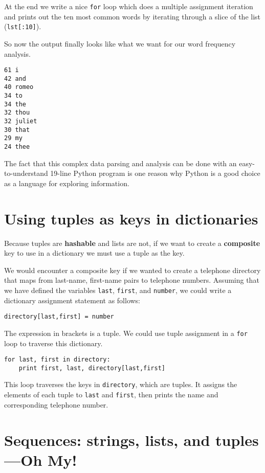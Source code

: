 At the end we write a nice {\tt for} loop which does a multiple
assignment iteration and prints out the ten most common words
by iterating through a slice of the list ({\tt lst[:10]}).

So now the output finally looks like what we want for our word 
frequency analysis.

\beforeverb
\begin{verbatim}
61 i
42 and
40 romeo
34 to
34 the
32 thou
32 juliet
30 that
29 my
24 thee
\end{verbatim}
\afterverb
%
The fact that this complex data parsing and analysis 
can be done with an easy-to-understand 19-line Python
program is one reason why Python is a good choice as a language 
for exploring information.

\section{Using tuples as keys in dictionaries}


Because tuples are {\bf hashable} and lists are not, if we want to 
create a {\bf composite} key to use in a dictionary we must use a tuple as
the key.

We would encounter a composite key if we wanted to create a 
telephone directory that maps
from last-name, first-name pairs to telephone numbers.  Assuming
that we have defined the variables 
{\tt last}, {\tt first}, and {\tt number}, we could write
a dictionary assignment statement as follows:

\beforeverb
\begin{verbatim}
directory[last,first] = number
\end{verbatim}
\afterverb
%
The expression in brackets is a tuple.  We could use tuple
assignment in a {\tt for} loop to traverse this dictionary.


\beforeverb
\begin{verbatim}
for last, first in directory:
    print first, last, directory[last,first]
\end{verbatim}
\afterverb
%
This loop traverses the keys in {\tt directory}, which are tuples.  It
assigns the elements of each tuple to {\tt last} and {\tt first}, then
prints the name and corresponding telephone number.

\section{Sequences: strings, lists, and tuples---Oh My!}


